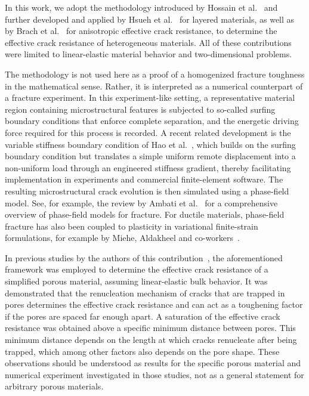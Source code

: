 \documentclass[pdflatex,sn-mathphys-num]{sn-jnl}%
\theoremstyle{thmstyleone}%
\theoremstyle{thmstyletwo}%
\theoremstyle{thmstylethree}%
\begin{document}
In this work, we adopt the methodology introduced
by Hossain et al.~\cite{hossain_effective_2014} and further
developed and applied by Hsueh et al.~\cite{hsueh_stress_2018} for layered materials,
as well as by Brach et al.~\cite{brach_anisotropy_2019} for anisotropic effective crack resistance,
to determine the effective crack resistance of heterogeneous materials.
All of these contributions were limited to linear-elastic material behavior and two-dimensional problems.

The methodology is not used here as a proof of a homogenized fracture toughness in the mathematical sense. Rather, it is interpreted as a numerical counterpart of a fracture experiment. 
In this experiment-like setting, 
a representative material region containing
 microstructural features is subjected 
 to so-called surfing boundary conditions that enforce complete separation, and the energetic driving force required for this process is recorded.
  A recent related development is the variable stiffness boundary condition of Hao et al.~\cite{hao_variable_2026}, which builds on the surfing boundary condition but translates a simple uniform remote displacement into a non-uniform load through an engineered stiffness gradient, thereby facilitating implementation in experiments and commercial finite-element software.
The resulting microstructural crack evolution is
then simulated using a phase-field model.
See, for example, the review by Ambati et al.~\cite{ambati_review_2015} for a comprehensive overview of phase-field models for fracture.
For ductile materials, phase-field fracture has also been coupled to plasticity in variational finite-strain formulations, for example by Miehe, Aldakheel and co-workers~\cite{miehe_phasefield_ductile_2016,miehe_phasefield_porous_2016}.

In previous studies by the authors of this contribution~\cite{schlueter_ermittlung_2025,schluter_determination_2025},
the aforementioned framework was employed to determine the effective crack resistance of a simplified porous material,
assuming linear-elastic bulk behavior. It was demonstrated that
the renucleation mechanism of cracks that are trapped in pores
determines the effective crack resistance
and can act as a toughening factor if the pores are
spaced far enough apart. A saturation of the effective crack resistance was obtained above
a specific minimum distance between pores. This minimum distance depends on the
length at which cracks renucleate after being trapped, which among other factors also
depends on the pore shape.
These observations should be understood as results for the specific porous material and numerical experiment investigated in those studies, not as a general statement for arbitrary porous materials.
\end{document}

